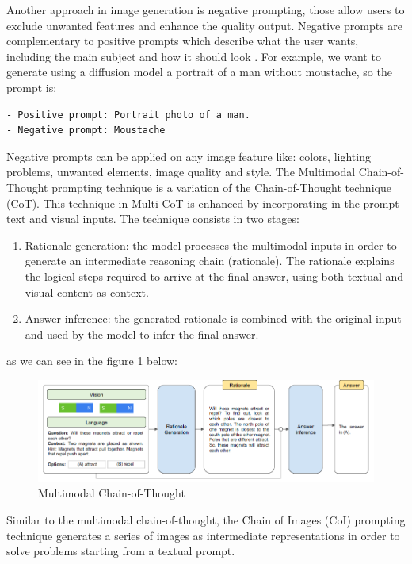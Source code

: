 Another approach in image generation is negative prompting, those allow users to exclude unwanted features and enhance the quality output.
Negative prompts are complementary to  positive prompts which describe what the user wants, including the main subject and how it should look \cite{medium_negative}.
For example, we want to generate using a diffusion model a portrait of a man without moustache, so the prompt is:
\begin{lstlisting}
- Positive prompt: Portrait photo of a man.
- Negative prompt: Moustache
\end{lstlisting}
Negative prompts can be applied on any image feature like: colors, lighting problems, unwanted elements, image quality and style.
The Multimodal Chain-of-Thought prompting technique \cite{zhang2023multimodal} is a variation of the Chain-of-Thought technique (CoT).
This technique in Multi-CoT is enhanced by incorporating in the prompt text and visual inputs.
The technique consists in two stages:
\begin{enumerate}
    \item Rationale generation: the model processes the multimodal inputs in order to generate an intermediate reasoning chain (rationale). The rationale explains the logical steps required to arrive at the final answer, using both textual and visual content as context.

    \item Answer inference: the generated rationale is combined with the original input and used by the model to infer the final answer.
\end{enumerate}
as we can see in the figure \ref{fig:16} below:
\begin{figure}[H]
    \centering
    \includegraphics[width=0.9\linewidth]{Figures/fig_16.png}
    \caption{Multimodal Chain-of-Thought}
    \label{fig:16}
\end{figure}
Similar to the multimodal chain-of-thought, the Chain of Images (CoI) prompting technique \cite{meng2023chain} generates a series of images as intermediate representations in order to solve problems starting from a textual prompt.
